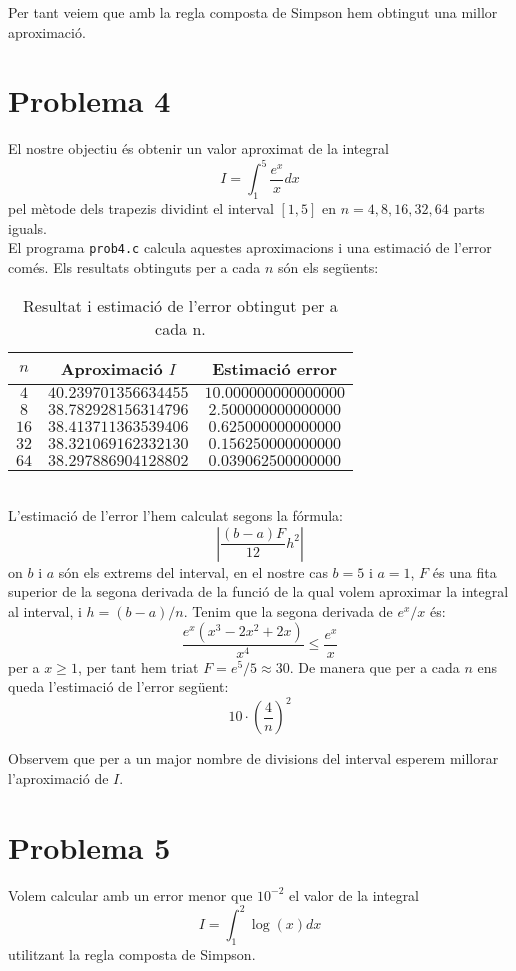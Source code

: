 \documentclass[12pt]{article}
\numberwithin{table}{section}
\numberwithin{figure}{section}
\numberwithin{equation}{section}
\begin{document}
Per tant veiem que amb la regla composta de Simpson hem obtingut una millor aproximació.
\newpage
\section*{Problema 4}
El nostre objectiu és obtenir un valor aproximat de la integral
\begin{equation*}
I=\int^{5}_1\dfrac{e^x}{x}dx
\end{equation*}
pel mètode dels trapezis dividint el interval $[1,5]$ en $n=4, 8, 16, 32, 64$ parts iguals.\\

El programa \texttt{prob4.c} calcula aquestes aproximacions i una estimació de l'error comés. Els resultats obtinguts per a cada $n$ són els següents:
\begin{table}[h!]
	\centering
	\caption{Resultat i estimació de l'error obtingut per a cada n.}	
	\begin{tabular}{c|c|c}
		$n$ & Aproximació $I$ &Estimació error\\
		\hline
		\hline
		$4$ & $40.239701356634455$  &$10.000000000000000$\\
		$8$ & $38.782928156314796$ &$2.500000000000000$\\
		$16$ & $38.413711363539406$ &$0.625000000000000$\\
		$32$ & $38.321069162332130$ &$0.156250000000000$\\
		$64$ & $38.297886904128802$ &$0.039062500000000$\\
	\end{tabular}
\end{table}\\
L'estimació de l'error l'hem calculat segons la fórmula:
$$\left| \dfrac{(b-a)F}{12}h^2 \right| $$
on $b$ i $a$ són els extrems del interval, en el nostre cas $b=5$ i $a=1$, $F$ és una fita superior de la segona derivada de la funció de la qual volem aproximar la integral al interval, i $h=(b-a)/n$. Tenim que la segona derivada de $e^x/x$ és:
$$\dfrac{e^x(x^3-2x^2+2x)}{x^4}\leq\dfrac{e^x}{x}$$
per a $x\geq 1$, per tant hem triat $F=e^5/5\approx30$. De manera que per a cada $n$ ens queda l'estimació de l'error següent:
$$10\cdot\left( \frac{4}{n}\right)^2 $$

Observem que per a un major nombre de divisions del interval esperem millorar l'aproximació de $I$.


	\newpage
	\section*{Problema 5}
	Volem calcular amb un error menor que $10^{-2}$ el valor de la integral
	$$I=\int_{1}^{2}\log(x)dx$$
	utilitzant la regla composta de Simpson.\\
	
\end{document}
